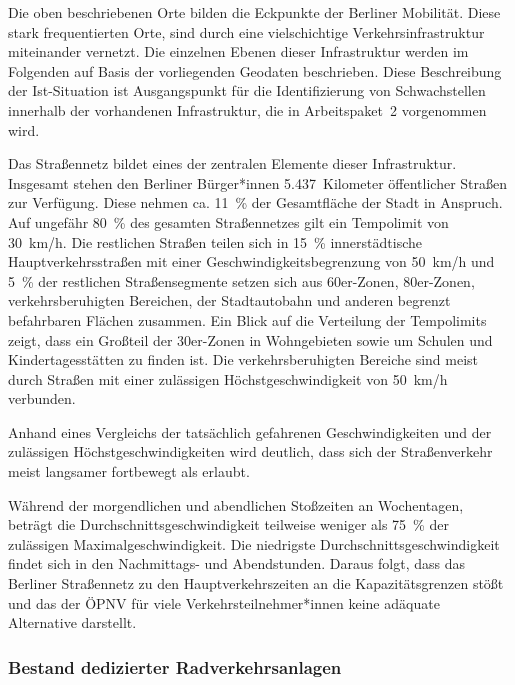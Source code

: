Die oben beschriebenen Orte bilden die Eckpunkte der Berliner Mobilität. Diese stark frequentierten Orte, sind durch eine vielschichtige Verkehrsinfrastruktur miteinander vernetzt. Die einzelnen Ebenen dieser Infrastruktur werden im Folgenden auf Basis der vorliegenden Geodaten beschrieben. Diese Beschreibung der Ist-Situation ist Ausgangspunkt für die Identifizierung von Schwachstellen innerhalb der vorhandenen Infrastruktur, die in Arbeitspaket~2 vorgenommen wird.

Das Straßennetz bildet eines der zentralen Elemente dieser Infrastruktur. Insgesamt stehen den Berliner Bürger*innen 5.437~Kilometer öffentlicher Straßen zur Verfügung. Diese nehmen ca. 11~\% der Gesamtfläche der Stadt in Anspruch. Auf ungefähr 80~\% des gesamten Straßennetzes gilt ein Tempolimit von 30~km/h. Die restlichen Straßen teilen sich in 15~\% innerstädtische Hauptverkehrsstraßen mit einer Geschwindigkeitsbegrenzung von 50~km/h und 5~\% der restlichen Straßensegmente setzen sich aus 60er-Zonen, 80er-Zonen, verkehrsberuhigten Bereichen, der Stadtautobahn und anderen begrenzt befahrbaren Flächen zusammen. Ein Blick auf die Verteilung der Tempolimits zeigt, dass ein Großteil der 30er-Zonen in Wohngebieten sowie um Schulen und Kindertagesstätten zu finden ist. Die verkehrsberuhigten Bereiche sind meist durch Straßen mit einer zulässigen Höchstgeschwindigkeit von 50~km/h verbunden.


Anhand eines Vergleichs der tatsächlich gefahrenen Geschwindigkeiten und der zulässigen Höchstgeschwindigkeiten wird deutlich, dass sich der Straßenverkehr meist langsamer fortbewegt als erlaubt.


Während der morgendlichen und abendlichen Stoßzeiten an Wochentagen, beträgt die Durchschnittsgeschwindigkeit teilweise weniger als 75~\% der zulässigen Maximalgeschwindigkeit. Die niedrigste Durchschnittsgeschwindigkeit findet sich in den Nachmittags- und Abendstunden. Daraus folgt, dass das Berliner Straßennetz zu den Hauptverkehrszeiten an die Kapazitätsgrenzen stößt und das der ÖPNV für viele Verkehrsteilnehmer*innen keine adäquate Alternative darstellt.

\subsubsection{Bestand dedizierter Radverkehrsanlagen}

